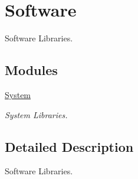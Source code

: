 \hypertarget{group___software}{\section{Software}
\label{group___software}
}


Software Libraries.  


\subsection*{Modules}
\begin{DoxyCompactItemize}
\item 
\hyperlink{group___system}{System}
\begin{DoxyCompactList}\small\item\em System Libraries. \end{DoxyCompactList}\end{DoxyCompactItemize}


\subsection{Detailed Description}
Software Libraries. 
